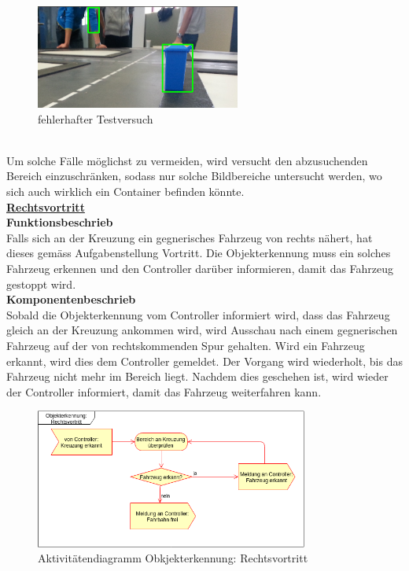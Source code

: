 \begin{figure}[H]%
\centering
\includegraphics[width=0.6\textwidth]{03_Loesungskonzept/pictures/objekterkennung_blau_fehl.png}
\caption{fehlerhafter Testversuch}
\label{fig:fehlerhafter Testversuch}
\end{figure} \\
Um solche Fälle möglichst zu vermeiden, wird versucht den abzusuchenden Bereich einzuschränken, sodass nur solche Bildbereiche untersucht werden, wo sich auch wirklich ein Container befinden könnte. 
\\[0.2cm]
\underline{\textbf{Rechtsvortritt}}
\\[0.2cm]
\textbf{Funktionsbeschrieb}\\[0.2cm]
Falls sich an der Kreuzung ein gegnerisches Fahrzeug von rechts nähert, hat dieses gemäss Aufgabenstellung Vortritt. Die Objekterkennung muss ein solches Fahrzeug erkennen und den Controller darüber informieren, damit das Fahrzeug gestoppt wird.
\\[0.2cm]
\textbf{Komponentenbeschrieb}\\[0.2cm]
Sobald die Objekterkennung vom Controller informiert wird, dass das Fahrzeug gleich an der Kreuzung ankommen wird, wird Ausschau nach einem gegnerischen Fahrzeug auf der von rechtskommenden Spur gehalten. Wird ein Fahrzeug erkannt, wird dies dem Controller gemeldet. Der Vorgang wird wiederholt, bis das Fahrzeug nicht mehr im Bereich liegt. Nachdem dies geschehen ist, wird wieder der Controller informiert, damit das Fahrzeug weiterfahren kann.
\begin{figure}[H]%
\centering
\includegraphics[width=0.8\textwidth]{03_Loesungskonzept/pictures/objekterkennung_rechtsvortritt.png}
\caption{Aktivitätendiagramm Obkjekterkennung: Rechtsvortritt}
\label{fig:activityRechtsvortritt}
\end{figure} \\

